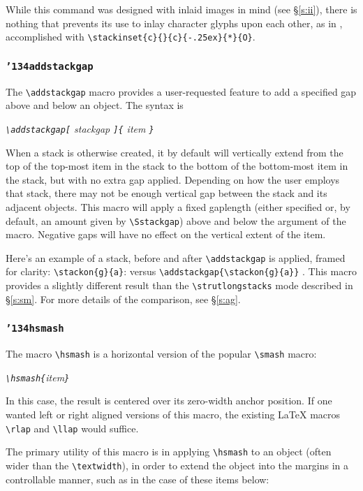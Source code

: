 \documentclass{article}
\let\vb\verb
\newcommand\cmd[1]{\texttt{\char'134#1}}
\begin{document}
While this command was designed with inlaid images in mind (see
\S\ref{s:ii}), there is nothing that prevents its use to inlay
character glyphs upon each other, as in 
, accomplished with
\vb|\stackinset{c}{}{c}{-.25ex}{*}{O}|.

\subsubsection{\cmd{addstackgap}\label{s:asg}}
\def\stacktype{S}

The \vb|\addstackgap| macro provides a user-requested feature to add a
specified gap above and below an object.  The syntax is

\itshape
  \vb|\addstackgap[|%
  stackgap%
  \vb|]{|%
  item%
  \vb|}|
\upshape

When a stack is otherwise created, it by default will vertically extend
from the top of the top-most item in the stack to the bottom of the
bottom-most item in the stack, but with no extra gap applied.  Depending
on how the user employs that stack, there may not be enough vertical gap
between the stack and its adjacent objects.  This macro will apply a
fixed gaplength (either specified or, by default, an amount given by
\vb|\Sstackgap|) above and below the argument of the macro.  Negative
gaps will have no effect on the vertical extent of the item.

Here's an example of a stack, before and after \vb|\addstackgap| is
applied, framed for clarity:
\vb|\stackon{g}{a}|:  versus
\vb|\addstackgap{\stackon{g}{a}}| .
This macro provides a slightly different result than the
\vb|\strutlongstacks| mode described in \S\ref{s:sm}.  For more details
of the comparison, see \S\ref{s:ag}.

\subsubsection{\cmd{hsmash}\label{s:hsm}}
\def\stacktype{L}

The macro \vb|\hsmash| is a horizontal version of the popular
\vb|\smash| macro:

\itshape
  \vb|\hsmash{|item\vb|}|
\upshape

In this case, the result is centered over its zero-width anchor
position.  If one wanted left or right aligned versions of this macro,
the existing \LaTeX{} macros \vb|\rlap| and \vb|\llap| would suffice.

The primary utility of this macro is in applying \vb|\hsmash| to an
object (often wider than the \vb|\textwidth|), in order to extend the
object into the margins in a controllable manner, such as in the case of
these items below:
\end{document}
